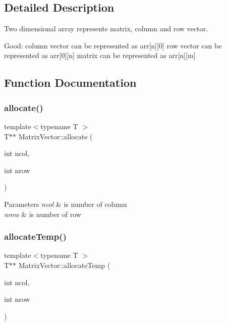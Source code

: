 \subsection{Detailed Description}
Two dimensional array represents matrix, column and row vector. 


\begin{DoxyEnumerate}
\item Good\+: column vector can be represented as arr\mbox{[}n\mbox{]}\mbox{[}0\mbox{]} row vector can be represented as arr\mbox{[}0\mbox{]}\mbox{[}n\mbox{]} matrix can be represented as arr\mbox{[}n\mbox{]}\mbox{[}m\mbox{]} 
\end{DoxyEnumerate}

\subsection{Function Documentation}
\mbox{\label{namespace_matrix_vector_a26820b913b9a7cc4ef30f3bf085a1560}} 
\subsubsection{\texorpdfstring{allocate()}{allocate()}}
{\footnotesize\ttfamily template$<$typename T $>$ \\
T$\ast$$\ast$ Matrix\+Vector\+::allocate (\begin{DoxyParamCaption}\item[{int}]{ncol,  }\item[{int}]{nrow }\end{DoxyParamCaption})}


\begin{DoxyParams}{Parameters}
{\em ncol} & is number of column \\
\hline
{\em nrow} & is number of row \\
\hline
\end{DoxyParams}
\mbox{\label{namespace_matrix_vector_af94d7bf32de597487458905d7f703d65}} 
\subsubsection{\texorpdfstring{allocate\+Temp()}{allocateTemp()}}
{\footnotesize\ttfamily template$<$typename T $>$ \\
T$\ast$$\ast$ Matrix\+Vector\+::allocate\+Temp (\begin{DoxyParamCaption}\item[{int}]{ncol,  }\item[{int}]{nrow }\end{DoxyParamCaption})}



